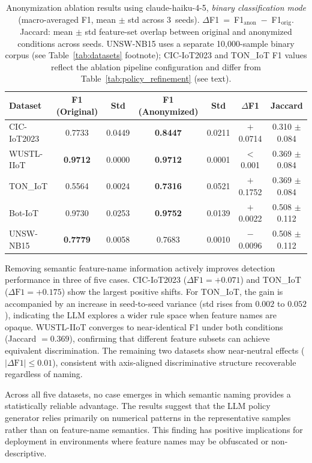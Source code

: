 \begin{table}[htbp]
\centering
\caption{Anonymization ablation results using claude-haiku-4-5, \emph{binary classification mode}
  (macro-averaged F1, mean $\pm$ std
  across 3~seeds). $\Delta$F1~=~F1$_{\text{anon}}$~$-$~F1$_{\text{orig}}$.
  Jaccard: mean $\pm$ std feature-set overlap between original and anonymized
  conditions across seeds.
  UNSW-NB15 uses a separate 10{,}000-sample binary corpus (see Table~\ref{tab:datasets} footnote);
  CIC-IoT2023 and TON\_IoT F1 values reflect the ablation pipeline configuration and
  differ from Table~\ref{tab:policy_refinement} (see text).}
\label{tab:anon_ablation}
\begin{tabular}{lcccccc}
\toprule
\textbf{Dataset} &
  \textbf{F1 (Original)} & \textbf{Std} &
  \textbf{F1 (Anonymized)} & \textbf{Std} &
  \textbf{$\Delta$F1} & \textbf{Jaccard} \\
\midrule
CIC-IoT2023 & 0.7733 & 0.0449 & \textbf{0.8447} & 0.0211 & $+$0.0714 & 0.310 $\pm$ 0.084 \\
WUSTL-IIoT  & \textbf{0.9712} & 0.0000 & \textbf{0.9712} & 0.0001 & $<$0.001 & 0.369 $\pm$ 0.084 \\
TON\_IoT    & 0.5564 & 0.0024 & \textbf{0.7316} & 0.0521 & $+$0.1752 & 0.369 $\pm$ 0.084 \\
Bot-IoT     & 0.9730 & 0.0253 & \textbf{0.9752} & 0.0139 & $+$0.0022 & 0.508 $\pm$ 0.112 \\
UNSW-NB15   & \textbf{0.7779} & 0.0058 & 0.7683 & 0.0010 & $-$0.0096 & 0.508 $\pm$ 0.112 \\
\bottomrule
\end{tabular}
\end{table}

Removing semantic feature-name information actively improves detection performance in three of five cases. CIC-IoT2023 ($\Delta\text{F1} = +0.071$) and TON\_IoT ($\Delta\text{F1} = +0.175$) show the largest positive shifts. For TON\_IoT, the gain is accompanied by an increase in seed-to-seed variance (std rises from $0.002$ to $0.052$), indicating the LLM explores a wider rule space when feature names are opaque. WUSTL-IIoT converges to near-identical F1 under both conditions (Jaccard $= 0.369$), confirming that different feature subsets can achieve equivalent discrimination. The remaining two datasets show near-neutral effects ($|\Delta\text{F1}| \leq 0.01$), consistent with axis-aligned discriminative structure recoverable regardless of naming.

Across all five datasets, no case emerges in which semantic naming provides a statistically reliable advantage. The results suggest that the LLM policy generator relies primarily on numerical patterns in the representative samples rather than on feature-name semantics. This finding has positive implications for deployment in environments where feature names may be obfuscated or non-descriptive. 

